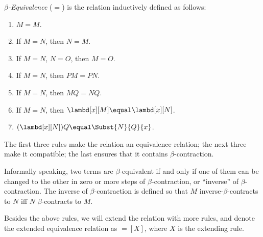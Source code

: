 \documentclass[../../../include/open-logic-section]{subfiles}
\begin{document}
\begin{defn}
  \emph{$\beta$-Equivalence} ($\equal$) is the relation inductively
  defined as follows:
  \begin{enumerate}
  \item $M \equal M$.
  \item If $M \equal N$, then $N \equal M$.
  \item If $M \equal N$, $N \equal O$, then $M \equal O$.
  \item If $M \equal N$, then $PM \equal PN$.
  \item If $M \equal N$, then $MQ \equal NQ$.
  \item If $M \equal N$, then $\lambd[x][M] \equal \lambd[x][N]$.
  \item $(\lambd[x][N])Q \equal \Subst{N}{Q}{x}$.
  \end{enumerate}
\end{defn}

The first three rules make the relation an equivalence relation; the
next three make it compatible; the last ensures that it contains
$\beta$-contraction.

Informally speaking, two terms are $\beta$-equivalent if and only if
one of them can be changed to the other in zero or more steps of
$\beta$-contraction, or ``inverse'' of $\beta$-contraction. The inverse of
$\beta$-contraction is defined so that $M$ inverse-$\beta$-contracts to $N$
iff $N$ $\beta$-contracts to $M$.

Besides the above rules, we will extend the relation with more
rules, and denote the extended equivalence relation as $\equal[X]$,
where $X$ is the extending rule.
\end{document}
